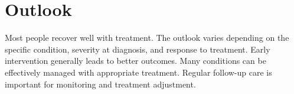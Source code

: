 \section{Outlook}
Most people recover well with treatment. The outlook varies depending on the specific condition, severity at diagnosis, and response to treatment. Early intervention generally leads to better outcomes. Many conditions can be effectively managed with appropriate treatment. Regular follow-up care is important for monitoring and treatment adjustment.
